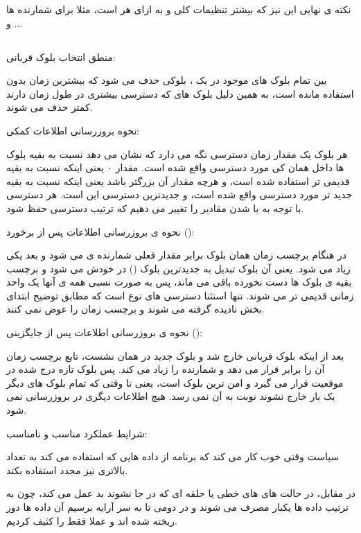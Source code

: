 \documentclass[12pt,a4paper]{article}
\begin{document}
نکته ی نهایی این نیز که بیشتر تنظیمات کلی و  به ازای هر  است، مثلا برای شمارنده ها و ...

\subsection{}

منطق انتخاب بلوک قربانی:

بین تمام بلوک های موجود در یک ، بلوکی حذف می شود که بیشترین زمان بدون استفاده مانده است، به همین دلیل بلوک های که دسترسی بیشتری در طول زمان دارند کمتر حذف می شوند.

نحوه بروزرسانی اطلاعات کمکی:

هر بلوک یک مقدار زمان دسترسی نگه می دارد که نشان می دهد نسبت به بقیه بلوک ها داخل همان  کی مورد دسترسی واقع شده است. مقدار ۰ یعنی اینکه نسبت به بقیه قدیمی تر استفاده شده است، و هرچه مقدار آن بزرگتر باشد یعنی اینکه نسبت به بقیه جدید تر مورد دسترسی واقع شده است، و جدیدترین دسترسی این  است. هر دسترسی با توجه به  یا  شدن مقادیر را تغییر می دهیم که ترتیب دسترسی حفظ شود.

نحوه ی بروزرسانی اطلاعات پس از برخورد ():

در هنگام  برچسب زمان همان بلوک برابر مقدار فعلی شمارنده ی  می شود و بعد  یکی زیاد می شود. یعنی آن بلوک تبدیل به جدیدترین بلوک () در  خودش می شود و برچسب بقیه ی بلوک ها دست نخورده باقی می ماند، پس به صورت نسبی همه ی آنها یک واحد زمانی قدیمی تر می شوند. تنها استثنا دسترسی های نوع  است که مطابق توضیح ابتدای بخش نادیده گرفته می شوند و برچسب زمان را عوض نمی کنند.

نحوه ی بروزرسانی اطلاعات پس از جایگزینی ():

بعد از اینکه بلوک قربانی خارج شد و بلوک جدید در همان  نشست، تابع  برچسب زمان آن  را برابر  قرار می دهد و شمارنده را زیاد می کند. پس بلوک تازه درج شده در موقعیت  قرار می گیرد و امن ترین بلوک  است، یعنی تا وقتی که تمام بلوک های دیگر یک بار خارج نشوند نوبت به آن نمی رسد. هیچ اطلاعات دیگری در  بروزرسانی نمی شود.

شرایط عملکرد مناسب و نامناسب:

سیاست  وقتی خوب کار می کند که برنامه از داده هایی که استفاده می کند به تعداد بالاتری نیز مجدد استفاده بکند.

در مقابل،  در حالت های  های خطی یا حلقه ای که در  جا نشوند بد عمل می کند، چون به ترتیب داده ها یکبار مصرف می شوند و در دومی تا به سر آرایه برسیم آن داده ها دور ریخته شده اند و عملا فقط  را کثیف کردیم.
\end{document}
